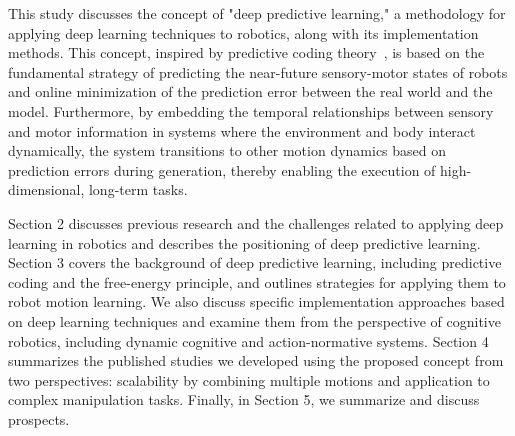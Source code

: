 This study discusses the concept of "deep predictive learning," a methodology for applying deep learning techniques to robotics, along with its implementation methods. This concept, inspired by predictive coding theory~\cite{Rao1999, Friston2006jpp, Friston2010nrn}, is based on the fundamental strategy of predicting the near-future sensory-motor states of robots and online minimization of the prediction error between the real world and the model. Furthermore, by embedding the temporal relationships between sensory and motor information in systems where the environment and body interact dynamically, the system transitions to other motion dynamics based on prediction errors during generation, thereby enabling the execution of high-dimensional, long-term tasks.


Section 2 discusses previous research and the challenges related to applying deep learning in robotics and describes the positioning of deep predictive learning. Section 3 covers the background of deep predictive learning, including predictive coding and the free-energy principle, and outlines strategies for applying them to robot motion learning. We also discuss specific implementation approaches based on deep learning techniques and examine them from the perspective of cognitive robotics, including dynamic cognitive and action-normative systems. Section 4 summarizes the published studies we developed using the proposed concept from two perspectives: scalability by combining multiple motions and application to complex manipulation tasks. Finally, in Section 5, we summarize and discuss prospects.

